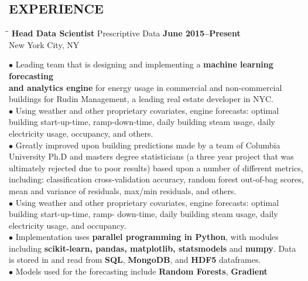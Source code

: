 \documentclass{resume}
\begin{document}
 
\address{ 
\href{mailto:david.karapetyan@gmail.com}{\nolinkurl{david.karapetyan@gmail.com}}
\\
\url{http://davidkarapetyan.com}}
\begin{resume}
\section{EXPERIENCE}
	\vspace{-0.05mm}

\begin{tabbing}
\hspace{2.3in}\= \hspace{2.6in}\= \kill
{\bf Head Data Scientist} \> Prescriptive Data   
\>\textbf{June 2015--Present } \\
    \>New York City, NY 
\end{tabbing}
$\bullet$
Leading team that is designing and implementing a \textbf{machine learning
forecasting \\ and analytics engine} for energy usage in commercial and non-commercial
buildings for Rudin Management, a leading real estate developer in NYC.  \\
$\bullet$ Using weather and other proprietary covariates, engine forecasts: optimal building start-up-time, ramp-down-time, 
daily building steam usage, daily electricity usage, occupancy, and others. \\
$\bullet$ 
Greatly improved upon building predictions made by a team of Columbia University
Ph.D and masters degree statisticians (a three year project that was ultimately
rejected due to poor results) based upon a number of different metrics,
including: classification cross-validation accuracy, random forest out-of-bag
scores, mean and variance of residuals, max/min residuals, and others. \\
$\bullet$
Using weather and other proprietary covariates, engine forecasts: optimal building start-up-time, ramp-
down-time, daily building steam usage, daily electricity usage, and occupancy.
\\
$\bullet$
Implementation uses \textbf{parallel programming in Python}, 
with modules including \textbf{scikit-learn, pandas, matplotlib, statsmodels}
and \textbf{numpy}.
Data is stored in and read from \textbf{SQL}, \textbf{MongoDB}, and \textbf{HDF5} dataframes.\\
$\bullet$
Models used for the forecasting include \textbf{Random Forests}, \textbf{Gradient
}
\end{resume}
\end{document}
